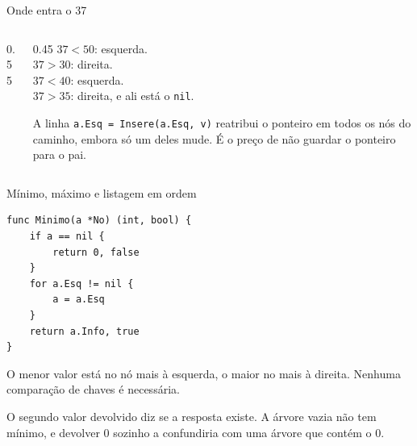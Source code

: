 \documentclass{beamer}
\begin{document}
\begin{frame}{Onde entra o 37}
  \begin{columns}
    \begin{column}{0.55\textwidth}
      \centering
    \end{column}
    \begin{column}{0.45\textwidth}
      $37 < 50$: esquerda.\\
      $37 > 30$: direita.\\
      $37 < 40$: esquerda.\\
      $37 > 35$: direita, e ali está o \texttt{nil}.

      \vspace{0.4cm}
      A linha \texttt{a.Esq = Insere(a.Esq, v)} reatribui o ponteiro em todos os
      nós do caminho, embora só um deles mude. É o preço de não guardar o
      ponteiro para o pai.
    \end{column}
  \end{columns}
\end{frame}

\begin{frame}[fragile]{Mínimo, máximo e listagem em ordem}
\begin{verbatim}
func Minimo(a *No) (int, bool) {
	if a == nil {
		return 0, false
	}
	for a.Esq != nil {
		a = a.Esq
	}
	return a.Info, true
}
\end{verbatim}

  \vspace{0.2cm}
  O menor valor está no nó mais à esquerda, o maior no mais à direita. Nenhuma
  comparação de chaves é necessária.

  \vspace{0.2cm}
  O segundo valor devolvido diz se a resposta existe. A árvore vazia não tem
  mínimo, e devolver 0 sozinho a confundiria com uma árvore que contém o 0.
\end{frame}
\end{document}
